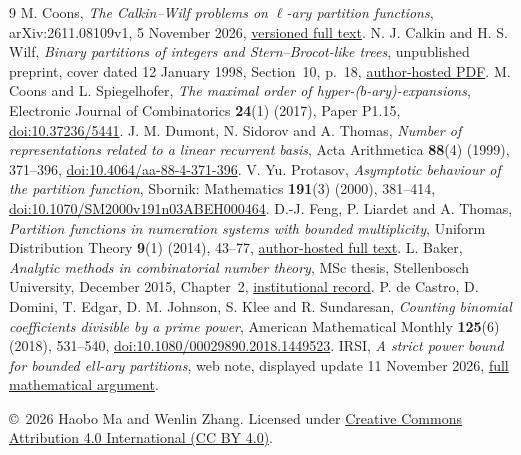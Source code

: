 \documentclass[11pt]{article}
\begin{document}
\begin{thebibliography}{9}
M. Coons, \emph{The Calkin--Wilf problems on $\ell$-ary partition
functions}, arXiv:2611.08109v1, 5 November 2026,
\href{https://arxiv.org/html/2611.08109v1}{versioned full text}.
N. J. Calkin and H. S. Wilf, \emph{Binary partitions of integers and
Stern--Brocot-like trees}, unpublished preprint, cover dated
12 January 1998, Section~10, p.~18,
\href{https://www.math.clemson.edu/~calkin/Papers/calkin_wilf_binary_partitions_unpublished.pdf}{author-hosted PDF}.
M. Coons and L. Spiegelhofer, \emph{The maximal order of
hyper-($b$-ary)-expansions}, Electronic Journal of Combinatorics
\textbf{24}(1) (2017), Paper P1.15,
\href{https://doi.org/10.37236/5441}{doi:10.37236/5441}.
J. M. Dumont, N. Sidorov and A. Thomas,
\emph{Number of representations related to a linear recurrent basis},
Acta Arithmetica \textbf{88}(4) (1999), 371--396,
\href{https://doi.org/10.4064/aa-88-4-371-396}{doi:10.4064/aa-88-4-371-396}.
V. Yu. Protasov, \emph{Asymptotic behaviour of the partition function},
Sbornik: Mathematics \textbf{191}(3) (2000), 381--414,
\href{https://doi.org/10.1070/SM2000v191n03ABEH000464}{doi:10.1070/SM2000v191n03ABEH000464}.
D.-J. Feng, P. Liardet and A. Thomas,
\emph{Partition functions in numeration systems with bounded multiplicity},
Uniform Distribution Theory \textbf{9}(1) (2014), 43--77,
\href{https://www.math.cuhk.edu.hk/~djfeng/fengpapers/Feng-Liardet-Thomsa/FengLiardetThomasPartition3R.pdf}{author-hosted full text}.
L. Baker, \emph{Analytic methods in combinatorial number theory},
MSc thesis, Stellenbosch University, December 2015, Chapter~2,
\href{https://hdl.handle.net/10019.1/98017}{institutional record}.
P. de Castro, D. Domini, T. Edgar, D. M. Johnson, S. Klee and
R. Sundaresan, \emph{Counting binomial coefficients divisible by a
prime power}, American Mathematical Monthly \textbf{125}(6) (2018),
531--540,
\href{https://doi.org/10.1080/00029890.2018.1449523}{doi:10.1080/00029890.2018.1449523}.
IRSI, \emph{A strict power bound for bounded ell-ary partitions},
web note, displayed update 11 November 2026,
\href{https://irsi.ai/notes/calkin-wilf-cw2/}{full mathematical argument}.
\end{thebibliography}
\medskip\noindent\small
\copyright\ 2026 Haobo Ma and Wenlin Zhang.
Licensed under \href{https://creativecommons.org/licenses/by/4.0/}{Creative Commons Attribution 4.0 International (CC BY 4.0)}.
\end{document}
